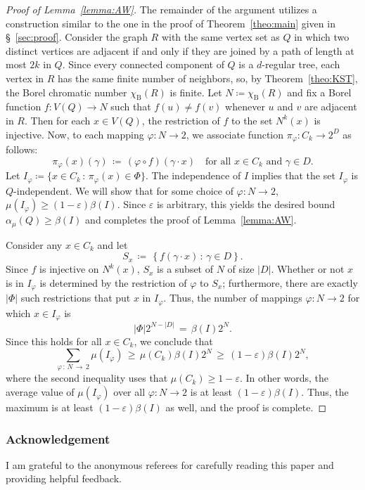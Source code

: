 \documentclass[10pt]{amsart}
\theoremstyle{definition}
\newcommand{\0}{\varnothing}
\newcommand{\set}[1]{\{#1\}}
\renewcommand{\epsilon}{\varepsilon}
\renewcommand{\phi}{\varphi}
\renewcommand{\geq}{\geqslant}
\newcommand{\defeq}{\coloneqq}
\newcommand{\rmB}{\mathrm{B}}
\begin{document}
\begin{proof}[{Proof of Lemma~\ref{lemma:AW}}]
The remainder of the argument utilizes a construction similar to the one in the proof of Theorem~\ref{theo:main} given in \S~\ref{sec:proof}. Consider the graph $R$ with the same vertex set as $Q$ in which two distinct vertices are adjacent if and only if they are joined by a path of length at most $2k$ in $Q$. Since every connected component of $Q$ is a $d$-regular tree, each vertex in $R$ has the same finite number of neighbors, so, by Theorem~\ref{theo:KST}, the Borel chromatic number $\chi_\rmB(R)$ is finite. Let $N
\defeq \chi_\rmB(R)$ and fix a Borel function $f \colon V(Q) \to N$ such that $f(u) \neq f(v)$ whenever $u$ and $v$ are adjacent in $R$. Then for each $x \in V(Q)$, the restriction of $f$ to the set $N^k(x)$ is injective. Now, to each mapping $\phi \colon N \to 2$, we associate function $\pi_\phi \colon C_k \to 2^D$ as follows:
\[
\pi_\phi(x)(\gamma) \,
\defeq\, (\phi \circ f)(\gamma \cdot x) \quad \text{for all } x \in C_k \text{ and } \gamma \in D.
\]
Let $I_\phi
\defeq \set{x \in C_k \,:\, \pi_\phi(x) \in \Phi}$. The independence of $I$ implies that the set $I_\phi$ is $Q$-independent. We will show that for some choice of $\phi \colon N \to 2$, $\mu(I_\phi) \geq (1-\epsilon) \beta(I)$. Since $\epsilon$ is arbitrary, this yields the desired bound $\alpha_\mu(Q) \geq \beta(I)$ and completes the proof of Lemma~\ref{lemma:AW}.

Consider any $x \in C_k$ and let
\[
S_x \,
\defeq\, \left\{f(\gamma \cdot x) \,:\, \gamma \in D\right\}.
\]
Since $f$ is injective on $N^k(x)$, $S_x$ is a subset of $N$ of size $|D|$. Whether or not $x$ is in $I_\phi$ is determined by the restriction of $\phi$ to $S_x$; furthermore, there are exactly $|\Phi|$ such restrictions that put $x$ in $I_\phi$. Thus, the number of mappings $\phi \colon N \to 2$ for which $x \in I_\phi$ is
\[
|\Phi|2^{N - |D|} \,=\, \beta(I)2^N.
\]
Since this holds for all $x \in C_k$, we conclude that
\[
\sum_{\phi\,\colon\,N\,\to\,2} \mu(I_\phi) \,\geq\, \mu\left(C_k\right) \beta(I)2^N \,\geq\, (1-\epsilon)\beta(I)2^N,
\]
where the second inequality uses that $\mu(C_k) \geq 1 - \epsilon$. In other words, the average value of $\mu(I_\phi)$ over all $\phi \colon N \to 2$ is at least $(1-\epsilon) \beta(I)$. Thus, the maximum is at least $(1-\epsilon) \beta(I)$ as well, and the proof is complete.
\end{proof}

\subsubsection*{Acknowledgement}
I am grateful to the anonymous referees for carefully reading this paper and providing helpful feedback.
\end{document}
